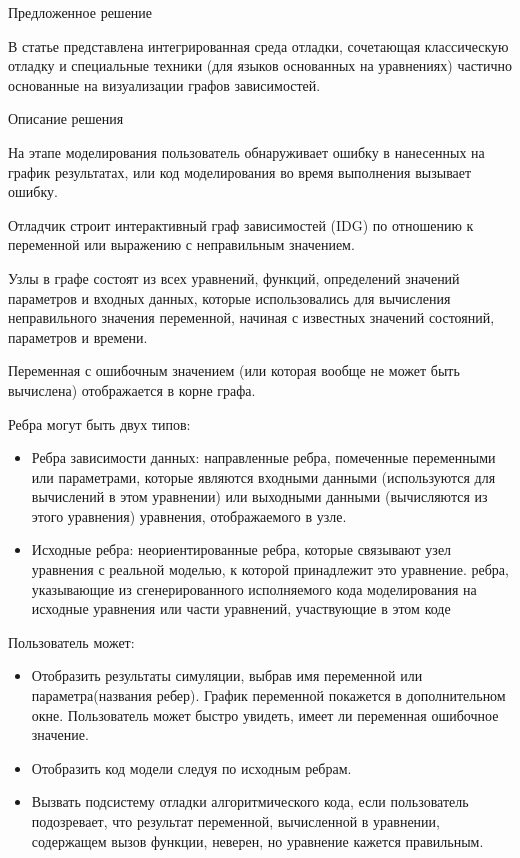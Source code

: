 Предложенное решение

В статье представлена интегрированная среда отладки, сочетающая классическую отладку и специальные техники (для языков основанных на уравнениях) частично основанные на визуализации графов зависимостей.
\newline

Описание решения

На этапе моделирования пользователь обнаруживает ошибку в нанесенных на график результатах, или код моделирования во время выполнения вызывает ошибку.

Отладчик строит интерактивный граф зависимостей (IDG) по отношению к переменной или выражению с неправильным значением.

Узлы в графе состоят из всех уравнений, функций, определений значений параметров и входных данных, которые использовались для вычисления неправильного значения переменной, начиная с известных значений состояний, параметров и времени.

Переменная с ошибочным значением (или которая вообще не может быть вычислена) отображается в корне графа.

Ребра могут быть двух типов:
\begin{itemize}
	\item Ребра зависимости данных: направленные ребра, помеченные переменными или параметрами, которые являются входными данными (используются для вычислений в этом уравнении) или выходными данными (вычисляются из этого уравнения) уравнения, отображаемого в узле.
	\item Исходные ребра: неориентированные ребра, которые связывают узел уравнения с реальной моделью, к которой принадлежит это уравнение.
	ребра, указывающие из сгенерированного исполняемого кода моделирования на исходные уравнения или части уравнений, участвующие в этом коде
\end{itemize}


Пользователь может:
\begin{itemize}
	\item Отобразить результаты симуляции, выбрав имя переменной или параметра(названия ребер). График переменной покажется в дополнительном окне. Пользователь может быстро увидеть, имеет ли переменная ошибочное значение.
	\item Отобразить код модели следуя по исходным ребрам.
	\item Вызвать подсистему отладки алгоритмического кода, если пользователь подозревает, что результат переменной, вычисленной в уравнении, содержащем вызов функции, неверен, но уравнение кажется правильным.
\end{itemize}

